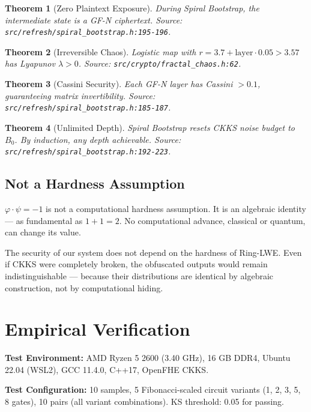 \documentclass[11pt,a4paper]{article}
\newtheorem{theorem}{Theorem}[section]
\begin{document}
\begin{theorem}[Zero Plaintext Exposure]
During Spiral Bootstrap, the intermediate state is a GF-N ciphertext. Source: \texttt{src/refresh/spiral\_bootstrap.h:195-196}.
\end{theorem}

\begin{theorem}[Irreversible Chaos]
Logistic map with $r = 3.7 + \text{layer} \cdot 0.05 > 3.57$ has Lyapunov $\lambda > 0$. Source: \texttt{src/crypto/fractal\_chaos.h:62}.
\end{theorem}

\begin{theorem}[Cassini Security]
Each GF-N layer has Cassini $> 0.1$, guaranteeing matrix invertibility. Source: \texttt{src/refresh/spiral\_bootstrap.h:185-187}.
\end{theorem}

\begin{theorem}[Unlimited Depth]
Spiral Bootstrap resets CKKS noise budget to $B_0$. By induction, any depth achievable. Source: \texttt{src/refresh/spiral\_bootstrap.h:192-223}.
\end{theorem}

\subsection{Not a Hardness Assumption}

$\varphi \cdot \psi = -1$ is not a computational hardness assumption. It is an algebraic identity --- as fundamental as $1 + 1 = 2$. No computational advance, classical or quantum, can change its value.

The security of our system does not depend on the hardness of Ring-LWE. Even if CKKS were completely broken, the obfuscated outputs would remain indistinguishable --- because their distributions are identical by algebraic construction, not by computational hiding.

\section{Empirical Verification}

\textbf{Test Environment:} AMD Ryzen 5 2600 (3.40 GHz), 16 GB DDR4, Ubuntu 22.04 (WSL2), GCC 11.4.0, C++17, OpenFHE CKKS.

\textbf{Test Configuration:} 10 samples, 5 Fibonacci-scaled circuit variants (1, 2, 3, 5, 8 gates), 10 pairs (all variant combinations). KS threshold: 0.05 for passing.
\end{document}
